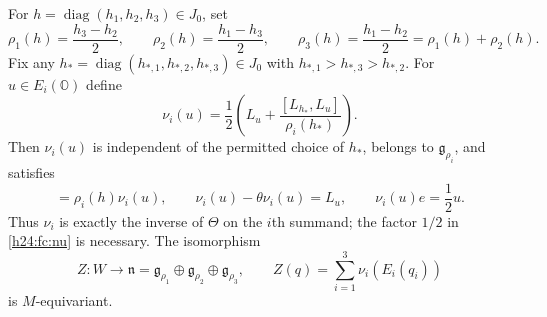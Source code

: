 \begin{lemma}
\label{h24:fc:cartan-inverse}
For $h=\operatorname{diag}(h_1,h_2,h_3)\in J_0$, set
\[
 \rho_1(h)=\frac{h_3-h_2}{2},\qquad
 \rho_2(h)=\frac{h_1-h_3}{2},\qquad
 \rho_3(h)=\frac{h_1-h_2}{2}=\rho_1(h)+\rho_2(h).
\]
Fix any
$h_*=\operatorname{diag}(h_{*,1},h_{*,2},h_{*,3})\in J_0$
with $h_{*,1}>h_{*,3}>h_{*,2}$. For $u\in E_i(\mathbb O)$ define
\begin{equation}
 \nu_i(u)=\frac12\left(L_u+
             \frac{[L_{h_*},L_u]}{\rho_i(h_*)}\right).
 \label{h24:fc:nu}
\end{equation}
Then $\nu_i(u)$ is independent of the permitted choice of $h_*$,
belongs to $\mathfrak g_{\rho_i}$, and satisfies
\begin{equation}
 [L_h,\nu_i(u)]=\rho_i(h)\nu_i(u),\qquad
 \nu_i(u)-\theta\nu_i(u)=L_u,\qquad
 \nu_i(u)e=\frac12u.
 \label{h24:fc:nu-identities}
\end{equation}
Thus $\nu_i$ is exactly the inverse of $\Theta$ on the $i$th summand;
the factor $1/2$ in \eqref{h24:fc:nu} is necessary.
The isomorphism
\[
 Z:W\longrightarrow\mathfrak n
       =\mathfrak g_{\rho_1}\oplus\mathfrak g_{\rho_2}
                               \oplus\mathfrak g_{\rho_3},\qquad
 Z(q)=\sum_{i=1}^3\nu_i(E_i(q_i))
\]
is $M$-equivariant.
\end{lemma}

